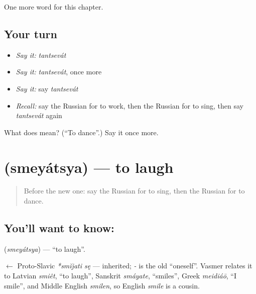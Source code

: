 \begin{grammarlens}[title={What you've built}]
One more word for this chapter.
\end{grammarlens}

\subsection*{Your turn}
\begin{itemize}
\raggedright
  \item \emph{Say it:} \emph{tantsevát}
  \item \emph{Say it:} \emph{tantsevát}, once more
  \item \emph{Say it:} say \emph{tantsevát}
  \item \emph{Recall:} say the Russian for to work, then the Russian for to sing, then say \emph{tantsevát} again
\end{itemize}

\begin{tcolorbox}[breakable,colback=teal!4,colframe=teal!35!black,title={Before you move on}]
What does  mean? (\textquotedblleft{}To dance\textquotedblright{}.) Say it once more.
\end{tcolorbox}
\section[\texorpdfstring{\ru{смеяться} (smeyátsya)}{смеяться (smeyátsya)}]{ (smeyátsya) — to laugh}

\label{lesson:RU-C38-smeyatsya}



\begin{quote}
Before the new one: say the Russian for to sing, then the Russian for to dance.
\end{quote}

\subsection*{You'll want to know: }
\textbf{} (\emph{smeyátsya}) — \textquotedblleft{}to laugh\textquotedblright{}.

\begin{cousinweb}
\textbf{} $\leftarrow$ Proto-Slavic \emph{*smĭjati sę} — inherited; \emph{-} is the old \textquotedblleft{}oneself\textquotedblright{}. Vasmer relates it to Latvian \emph{smiêt}, \textquotedblleft{}to laugh\textquotedblright{}, Sanskrit \emph{smáyate}, \textquotedblleft{}smiles\textquotedblright{}, Greek \emph{meidiáō}, \textquotedblleft{}I smile\textquotedblright{}, and Middle English \emph{smilen}, so English \emph{smile} is a cousin.
\end{cousinweb}

